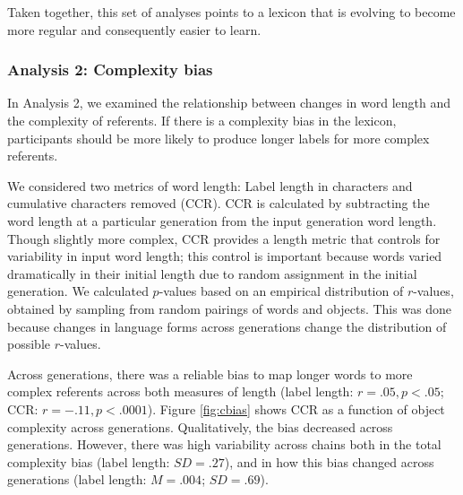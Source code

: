 Taken together, this set of analyses points to a lexicon that is evolving to become more regular and consequently easier to learn.



                         



\subsubsection{Analysis 2: Complexity bias} 

In Analysis  2, we examined the relationship between changes in word length and the complexity of referents. If there is a complexity bias in the lexicon, participants should be more likely to produce longer labels for more complex referents. 

We considered two metrics of word length: Label length in characters and cumulative characters removed (CCR). CCR is calculated by subtracting the word length at a particular generation from the input generation word length. Though slightly more complex, CCR provides a length metric that controls for variability in input word length; this control is important because words varied dramatically in their initial length due to random assignment in the initial generation. We calculated $p$-values based on an empirical distribution of $r$-values, obtained by sampling from random pairings of words and objects. This was done because changes in  language forms across generations change the distribution of possible $r$-values.

Across generations, there was a reliable bias to map longer words to more complex referents across both measures of length (label length: $r=.05, p<.05$; CCR: $r=-.11, p<.0001$). Figure \ref{fig:cbias} shows CCR as a function of object complexity across generations. Qualitatively, the bias decreased across generations. However, there was high variability across chains both in the total complexity bias (label length: $SD = .27$), and in how this bias changed across generations (label length: $M = .004$; $SD = .69$).


